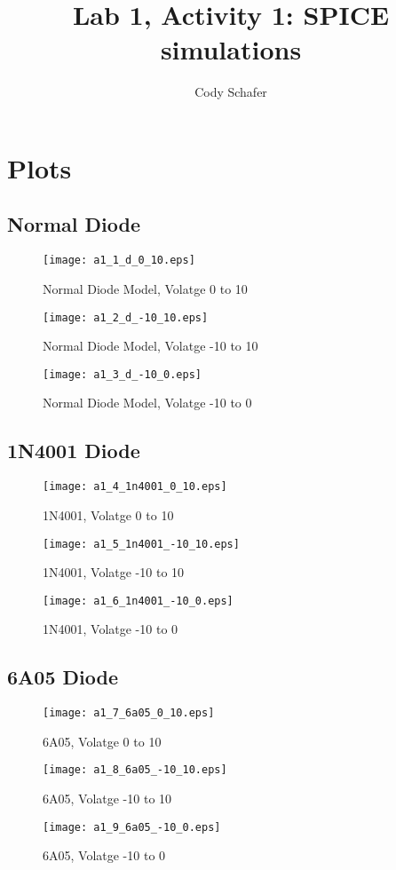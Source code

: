 \documentclass[10pt]{article}
\title{Lab 1, Activity 1: SPICE simulations}
\author{Cody Schafer}
\begin{document}
\section{Plots}

\subsection{Normal Diode}
	\begin{figure}[h!]
		\centering
		\texttt{[image: a1\_1\_d\_0\_10.eps]}
		\caption{Normal Diode Model, Volatge 0 to 10}
		\label{fig:digraph}
	\end{figure}

	\begin{figure}[h!]
		\centering
		\texttt{[image: a1\_2\_d\_-10\_10.eps]}
		\caption{Normal Diode Model, Volatge -10 to 10}
		\label{fig:digraph}
	\end{figure}

	\begin{figure}[h!]
		\centering
		\texttt{[image: a1\_3\_d\_-10\_0.eps]}
		\caption{Normal Diode Model, Volatge -10 to 0}
		\label{fig:digraph}
	\end{figure}

\subsection{1N4001 Diode}

	\begin{figure}[h!]
		\centering
		\texttt{[image: a1\_4\_1n4001\_0\_10.eps]}
		\caption{1N4001, Volatge 0 to 10}
		\label{fig:digraph}
	\end{figure}

	\begin{figure}[h!]
		\centering
		\texttt{[image: a1\_5\_1n4001\_-10\_10.eps]}
		\caption{1N4001, Volatge -10 to 10}
		\label{fig:digraph}
	\end{figure}

	\begin{figure}[h!]
		\centering
		\texttt{[image: a1\_6\_1n4001\_-10\_0.eps]}
		\caption{1N4001, Volatge -10 to 0}
		\label{fig:digraph}
	\end{figure}


\subsection{6A05 Diode}

	\begin{figure}[h!]
		\centering
		\texttt{[image: a1\_7\_6a05\_0\_10.eps]}
		\caption{6A05, Volatge 0 to 10}
		\label{fig:digraph}
	\end{figure}

	\begin{figure}[h!]
		\centering
		\texttt{[image: a1\_8\_6a05\_-10\_10.eps]}
		\caption{6A05, Volatge -10 to 10}
		\label{fig:digraph}
	\end{figure}

	\begin{figure}[h!]
		\centering
		\texttt{[image: a1\_9\_6a05\_-10\_0.eps]}
		\caption{6A05, Volatge -10 to 0}
		\label{fig:digraph}
	\end{figure}
\end{document}
